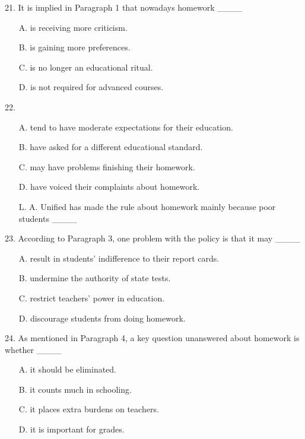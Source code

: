 \documentclass[UTF8,11pt]{ctexart}
\begin{document}
21. It is implied in Paragraph 1 that nowadays homework \_\_\_\_


\begin{itemize}[leftmargin=2em,itemsep=.2em,topsep=.4em]\item[A.] is receiving more criticism.
\item[B.] is gaining more preferences.
\item[C.] is no longer an educational ritual.
\item[D.] is not required for advanced courses.
\end{itemize}

22.


\begin{itemize}[leftmargin=2em,itemsep=.2em,topsep=.4em]\item[A.] tend to have moderate expectations for their education.
\item[B.] have asked for a different educational standard.
\item[C.] may have problems finishing their homework.
\item[D.] have voiced their complaints about homework.
\item[L.] A. Unified has made the rule about homework mainly because poor students \_\_\_\_
\end{itemize}

23. According to Paragraph 3, one problem with the policy is that it may \_\_\_\_


\begin{itemize}[leftmargin=2em,itemsep=.2em,topsep=.4em]\item[A.] result in students’ indifference to their report cards.
\item[B.] undermine the authority of state tests.
\item[C.] restrict teachers’ power in education.
\item[D.] discourage students from doing homework.
\end{itemize}

24. As mentioned in Paragraph 4, a key question unanswered about homework is whether \_\_\_\_


\begin{itemize}[leftmargin=2em,itemsep=.2em,topsep=.4em]\item[A.] it should be eliminated.
\item[B.] it counts much in schooling.
\item[C.] it places extra burdens on teachers.
\item[D.] it is important for grades.
\end{itemize}
\end{document}
